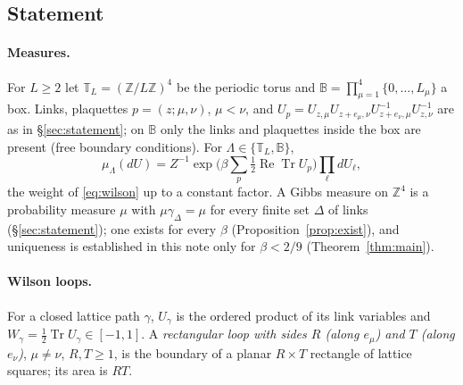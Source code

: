 \documentclass[11pt,a4paper]{article}
\theoremstyle{remark}
\theoremstyle{definition}
\theoremstyle{plain}
\theoremstyle{remark}
\newcommand{\Z}{\mathbb{Z}}
\newcommand{\ReTr}{\operatorname{Re}\operatorname{Tr}}
\begin{document}
\subsection{Statement}\label{sec:areastat}

\paragraph{Measures.} For $L\ge2$ let $\mathbb T_L=(\Z/L\Z)^4$ be the periodic torus and $\mathbb B=\prod_{\mu=1}^4\{0,\dots,L_\mu\}$ a box. Links, plaquettes $p=(z;\mu,\nu)$, $\mu<\nu$, and $U_p=U_{z,\mu}U_{z+e_\mu,\nu}U_{z+e_\nu,\mu}^{-1}U_{z,\nu}^{-1}$ are as in \S\ref{sec:statement}; on $\mathbb B$ only the links and plaquettes inside the box are present (free boundary conditions). For $\Lambda\in\{\mathbb T_L,\mathbb B\}$,
\begin{equation}\label{eq:al-fin}
\mu_\Lambda(dU)=Z^{-1}\exp\Big(\beta\sum_p\tfrac12\ReTr U_p\Big)\prod_\ell dU_\ell ,
\end{equation}
the weight of \eqref{eq:wilson} up to a constant factor. A Gibbs measure on $\Z^4$ is a probability measure $\mu$ with $\mu\gamma_\Delta=\mu$ for every finite set $\Delta$ of links (\S\ref{sec:statement}); one exists for every $\beta$ (Proposition~\ref{prop:exist}), and uniqueness is established in this note only for $\beta<2/9$ (Theorem~\ref{thm:main}).

\paragraph{Wilson loops.} For a closed lattice path $\gamma$, $U_\gamma$ is the ordered product of its link variables and $W_\gamma=\frac12\operatorname{Tr}U_\gamma\in[-1,1]$. A \emph{rectangular loop with sides $R$ (along $e_\mu$) and $T$ (along $e_\nu$)}, $\mu\ne\nu$, $R,T\ge1$, is the boundary of a planar $R\times T$ rectangle of lattice squares; its area is $RT$.
\end{document}
